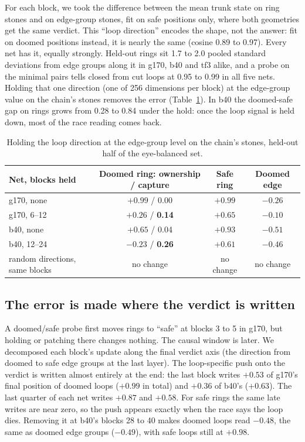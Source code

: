 \documentclass[11pt]{article}
\newcommand{\pos}[1]{$+#1$}
\newcommand{\nega}[1]{$-#1$}
\begin{document}
For each block, we took the difference between the mean trunk state on ring stones and on edge-group stones, fit on safe positions only, where both geometries get the same verdict. This ``loop direction'' encodes the shape, not the answer: fit on doomed positions instead, it is nearly the same (cosine 0.89 to 0.97). Every net has it, equally strongly. Held-out rings sit 1.7 to 2.0 pooled standard deviations from edge groups along it in g170, b40 and tf3 alike, and a probe on the minimal pairs tells closed from cut loops at 0.95 to 0.99 in all five nets. Holding that one direction (one of 256 dimensions per block) at the edge-group value on the chain's stones removes the error (Table~\ref{tab:holds}). In b40 the doomed-safe gap on rings grows from 0.28 to 0.84 under the hold: once the loop signal is held down, most of the race reading comes back.

\begin{table}[h]
\centering\small
\begin{tabular}{@{}lccc@{}}
\toprule
Net, blocks held & Doomed ring: ownership / capture & Safe ring & Doomed edge \\
\midrule
g170, none & $+0.99$ / 0.00 & $+0.99$ & $-0.26$ \\
g170, 6--12 & $\mathbf{+0.26}$ / \textbf{0.14} & $+0.65$ & $-0.10$ \\
b40, none & $+0.65$ / 0.04 & $+0.93$ & $-0.51$ \\
b40, 12--24 & $\mathbf{-0.23}$ / \textbf{0.26} & $+0.61$ & $-0.46$ \\
random directions, same blocks & no change & no change & no change \\
\bottomrule
\end{tabular}
\caption{Holding the loop direction at the edge-group level on the chain's stones, held-out half of the eye-balanced set.}
\label{tab:holds}
\end{table}

\subsection{The error is made where the verdict is written}

A doomed/safe probe first moves rings to ``safe'' at blocks 3 to 5 in g170, but holding or patching there changes nothing. The causal window is later. We decomposed each block's update along the final verdict axis (the direction from doomed to safe edge groups at the last layer). The loop-specific push onto the verdict is written almost entirely at the end: the last block writes \pos{0.53} of g170's final position of doomed loops (\pos{0.99} in total) and \pos{0.36} of b40's (\pos{0.63}). The last quarter of each net writes \pos{0.87} and \pos{0.58}. For safe rings the same late writes are near zero, so the push appears exactly when the race says the loop dies. Removing it at b40's blocks 28 to 40 makes doomed loops read \nega{0.48}, the same as doomed edge groups (\nega{0.49}), with safe loops still at \pos{0.98}.
\end{document}
